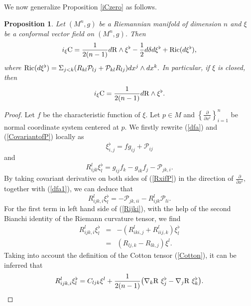 \documentclass[10pt,leqno,oneside]{amsart}
\newtheorem{Prop}{Proposition}
\begin{document}
{         We now generalize Proposition \ref{iCzero} as follows.
    \begin{Prop}\label{iC}
          Let $(M^n, g)$ be a Riemannian manifold of dimension $n$ and $\xi$ be a conformal vector field on $(M^n, g)$. Then
          $$i_{\xi}{\rm{C}}=\frac{1}{2(n-1)}d{\rm{R}}\wedge \xi^{\flat}-\frac{1}{2}d\delta d\xi^{\flat}+{\rm Ric}(d\xi^{\flat}),$$
          where ${\rm Ric}(d\xi^{\flat})=\Sigma_{j<k}(R_{kl}\mathcal{P}_{lj}+\mathcal{P}_{kl}R_{lj})dx^j\wedge dx^k.$
          In particular, if $\xi$ is closed, then
          $$i_{\xi}{\rm{C}}=\frac{1}{2(n-1)}d{\rm{R}}\wedge \xi^{\flat}.$$
    \end{Prop}
    \begin{proof}
          Let $f$ be the characteristic function of $\xi.$ Let $p\in M$ and $\left\{\frac{\partial}{\partial x^i}\right\}_{i=1}^n$ be normal coordinate system centered at $p.$ We firstly rewrite (\ref{dfa}) and (\ref{CovariantofP}) locally as
          \begin{equation}\label{dfa1}
            \xi^{\flat}_{i,j}=fg_{ij}+\mathcal{P}_{ij}
          \end{equation}
          and
          \begin{equation}\label{RxifP}
             R_{ijk}^l\xi_l^{\flat}=g_{ij}f_k-g_{ik}f_j-\mathcal{P}_{jk,i}.
          \end{equation}
          By taking covariant derivative on both sides of (\ref{RxifP}) in the direction of $\frac{\partial}{\partial x^i},$ together with (\ref{dfa1}), we can deduce that
           \begin{equation}\label{Rijki}
             R_{ijk,i}^l\xi_l^{\flat}=-\mathcal{P}_{jk,ii}-R_{ijk}^l\mathcal{P}_{li}.
           \end{equation}
           For the first term in left hand side of (\ref{Rijki}), with the help of the second Bianchi identity of the Riemann curvature tensor, we find
           \begin{eqnarray*}
            R_{ijk,i}^l\xi_l^{\flat} &=&-(R_{iki,j}^l+R_{iij,k}^l)\xi_l^{\flat} \\
              &=&(R_{lj,k}-R_{lk,j})\xi^l.
           \end{eqnarray*}
           Taking into account the definition of the Cotton tensor (\ref{Cotton}), it can be inferred that
           \begin{eqnarray}\label{2}
            R_{ijk,i}^l\xi_l^{\flat} =C_{ljk}\xi^l+\frac{1}{2(n-1)}\big(\nabla_k{\rm{R}} ~\xi_j^{\flat}-\nabla_j{\rm{R}} ~\xi_k^{\flat}\big).

\end{eqnarray}
\end{proof}}
\end{document}
